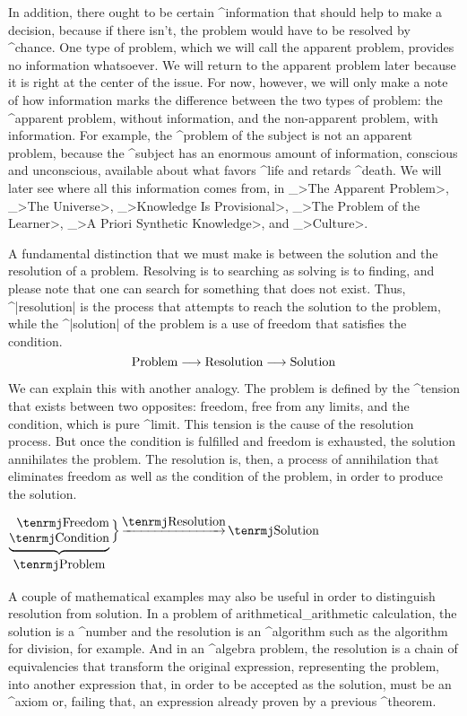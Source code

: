 In addition, there ought to be certain ^{information} that should help
to make a decision, because if there isn't, the problem would have to be
resolved by ^{chance}. One type of problem, which we will call the
apparent problem, provides no information whatsoever. We will return to
the apparent problem later because it is right at the center of the
issue. For now, however, we will only make a note of how information
marks the difference between the two types of problem: the ^{apparent
problem}, without information, and the non-apparent problem, with
information. For example, the ^{problem of the subject} is not an
apparent problem, because the ^{subject} has an enormous amount of
information, conscious and unconscious, available about what favors
^{life} and retards ^{death}. We will later see where all this
information comes from, in _>The Apparent Problem>, _>The Universe>,
_>Knowledge Is Provisional>, _>The Problem of the Learner>,
_>A Priori Synthetic Knowledge>, and _>Culture>.

A fundamental distinction that we must make is between the solution and
the resolution of a problem. Resolving is to searching as solving is to
finding, and please note that one can search for something that does not
exist. Thus, ^|resolution| is the process that attempts to reach the
solution to the problem, while the ^|solution| of the problem is a use
of freedom that satisfies the condition.
$$ \hbox{Problem} \longrightarrow
 \hbox{Resolution} \longrightarrow \hbox{Solution}$$

We can explain this with another analogy. The problem is defined by the
^{tension} that exists between two opposites: freedom, free from any
limits, and the condition, which is pure ^{limit}. This tension is the
cause of the resolution process. But once the condition is fulfilled and
freedom is exhausted, the solution annihilates the problem. The
resolution is, then, a process of annihilation that eliminates freedom
as well as the condition of the problem, in order to produce the
solution.

\bigskip
\centerline{$\underbrace{\vcenter{
  \halign{\strut\hfil\rm#\crcr Freedom\cr Condition\cr}}
    }_{\hbox{\rm\strut Problem}} \, \Bigr\rbrace
 \mathop{\hbox to 80pt{\rightarrowfill}}\limits^{\hbox{\rm Resolution}}
 \hbox{\rm Solution}$}
\bigskip

A couple of mathematical examples may also be useful in order to
distinguish resolution from solution. In a problem of
arithmetical_{arithmetic} calculation, the solution is a ^{number} and
the resolution is an ^{algorithm} such as the algorithm for division,
for example. And in an ^{algebra} problem, the resolution is a chain of
equivalencies that transform the original expression, representing the
problem, into another expression that, in order to be accepted as the
solution, must be an ^{axiom} or, failing that, an expression already
proven by a previous ^{theorem}.


